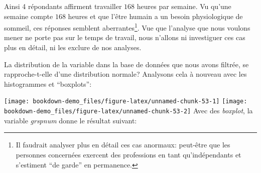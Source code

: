 \documentclass[
]{book}
\newenvironment{Shaded}{\begin{snugshade}}{\end{snugshade}}
\newcommand{\AttributeTok}[1]{\textcolor[rgb]{0.77,0.63,0.00}{#1}}
\newcommand{\CommentTok}[1]{\textcolor[rgb]{0.56,0.35,0.01}{\textit{#1}}}
\newcommand{\DecValTok}[1]{\textcolor[rgb]{0.00,0.00,0.81}{#1}}
\newcommand{\FunctionTok}[1]{\textcolor[rgb]{0.00,0.00,0.00}{#1}}
\newcommand{\NormalTok}[1]{#1}
\newcommand{\SpecialCharTok}[1]{\textcolor[rgb]{0.00,0.00,0.00}{#1}}
\newcommand{\StringTok}[1]{\textcolor[rgb]{0.31,0.60,0.02}{#1}}
\begin{document}
Ainsi 4 répondants affirment travailler \(168\) heures par semaine. Vu qu'une semaine compte \(168\) heures et que l'être humain a un besoin physiologique de sommeil, ces réponses semblent aberrantes\footnote{Il faudrait analyser plus en détail ces cas anormaux: peut-être que les personnes concernées exercent des professions en tant qu'indépendants et s'estiment ``de garde'' en permanence.}. Vue que l'analyse que nous voulons mener ne porte pas sur le temps de travail, nous n'allons ni investiguer ces cas plus en détail, ni les exclure de nos analyses.

La distribution de la variable dans la base de données que nous avons filtrée, se rapproche-t-elle d'une distribution normale? Analysons cela à nouveau avec les histogrammes et ``boxplots'':

\begin{Shaded}
\end{Shaded}

\texttt{[image: bookdown-demo\_files/figure-latex/unnamed-chunk-53-1]} \texttt{[image: bookdown-demo\_files/figure-latex/unnamed-chunk-53-2]}
Avec des \emph{boxplot}, la variable \emph{grspnum} donne le résultat suivant:
\end{document}
